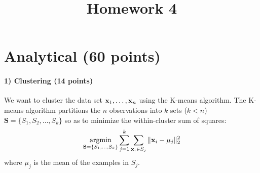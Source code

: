 \documentclass{article}
\newcommand{\vx}{{\bf x}}
\newcommand{\vxi}{{\bf x}_i}
\begin{document}
\title{Homework 4}
\maketitle
\thispagestyle{fancy}


\section{Analytical (60 points)}

\paragraph{1) Clustering (14 points)}

We want to cluster the data set $\vx_1,\ldots,\vx_n$ using the K-means algorithm. The K-means algorithm partitions the $n$ observations into $k$ sets ($k < n$) $\mathbf{S} = \{S_1, S_2, \ldots, S_k\}$ so as to minimize the within-cluster sum of squares:
\begin{eqnarray*}
	\mathop{\textrm{argmin}}_{\mathbf{S}=\{S_1,\ldots,S_k\}}\sum_{j=1}^k\sum_{\vxi\in S_j}\|\vx_i-\mu_j\|_2^2
\end{eqnarray*}
where $\mu_j$ is the mean of the examples in $S_j$.
\end{document}
